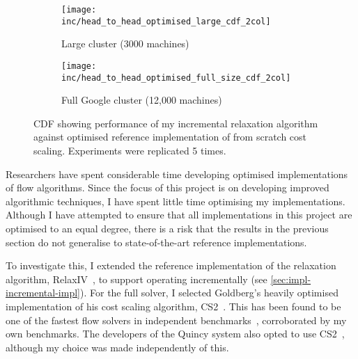\begin{figure}
    \begin{widepage}
        \begin{subfigure}[c]{0.5\textwidth}
            \texttt{[image: inc/head\_to\_head\_optimised\_large\_cdf\_2col]}
            \caption{Large cluster (3000 machines)}
            \label{fig:inc-head-to-head-optimised:large}
        \end{subfigure}
        \begin{subfigure}[c]{0.5\textwidth}
            \texttt{[image: inc/head\_to\_head\_optimised\_full\_size\_cdf\_2col]}
            \caption{Full Google cluster (12,000 machines)}
            \label{fig:inc-head-to-head-optimised:full-size}
        \end{subfigure}
    \end{widepage}
    \caption[Performance of my incremental algorithm against optimised reference implementation]{CDF showing performance of my incremental relaxation algorithm against optimised reference implementation of from scratch cost scaling. Experiments were replicated 5 times.}
    \label{fig:inc-head-to-head-optimised}
\end{figure}

Researchers have spent considerable time developing optimised implementations of flow algorithms. Since the focus of this project is on developing improved algorithmic techniques, I have spent little time optimising my implementations. Although I have attempted to ensure that all implementations in this project are optimised to an equal degree, there is a risk that the results in the previous section do not generalise to state-of-the-art reference implementations. 

To investigate this, I extended the reference implementation of the relaxation algorithm, RelaxIV~\cite{RelaxIV:2011}, to support operating incrementally (see \cref{sec:impl-incremental-impl}). For the full solver, I selected Goldberg's heavily optimised implementation of his cost scaling algorithm, CS2~\cite{CS2:2009}. This has been found to be one of the fastest flow solvers in independent benchmarks~\cite{KiralyKovacs:2012}, corroborated by my own benchmarks. The developers of the Quincy system also opted to use CS2~\cite{Isard:2009}, although my choice was made independently of this.

